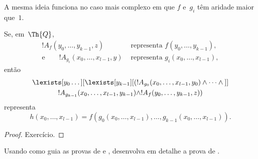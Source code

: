 \documentclass[../../../include/open-logic-section]{subfiles}
\begin{document}
A mesma ideia funciona no caso mais complexo em que $f$ e~$g_i$ têm
aridade maior que~$1$.

\begin{prop}
Se, em~$\Th{Q}$,
\[
\begin{aligned}
  !A_f(y_0, \dots, y_{k-1}, z)
    &\text{ representa } f(y_0, \dots, y_{k-1}),\\
  \text{e}\qquad !A_{g_i}(x_0, \dots, x_{l-1}, y)
    &\text{ representa } g_i(x_0, \dots, x_{l-1}),
\end{aligned}
\]
então
\begin{multline*}
  \lexists[y_0\dots][\lexists[y_{k-1}][(!A_{g_0}(x_0,\dots,x_{l-1},y_0) \land
      \dots \land {}]]\\
  !A_{g_{k-1}}(x_0,\dots,x_{l-1},y_{k-1}) \land !A_f(y_0,\dots,y_{k-1},z))
\end{multline*}
representa
\[
h(x_0, \dots, x_{l-1}) = f(g_0(x_0, \dots, x_{l-1}), \dots, g_{k-1}(x_0,
\dots, x_{l-1})).
\]
\end{prop}

\begin{proof}
Exercício.
\end{proof}

\begin{prob}
Usando como guia as provas de  e
, desenvolva em detalhe a prova de
.
\end{prob}
\end{document}
